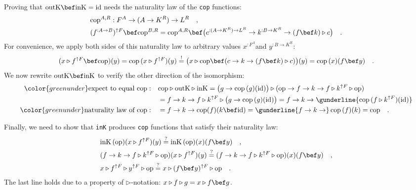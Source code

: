 Proving that $\text{outK}\bef\text{inK}=\text{id}$ needs the naturality
law of the \lstinline!cop! functions:
\begin{align*}
 & \text{cop}^{A,R}:F^{A}\rightarrow(A\rightarrow K^{R})\rightarrow L^{R}\quad,\\
 & (f^{:A\rightarrow B})^{\uparrow F}\bef\text{cop}^{B,R}=\text{cop}^{A,R}\bef\big(c^{:(A\rightarrow K^{R})\rightarrow L^{R}}\rightarrow k^{:B\rightarrow K^{R}}\rightarrow(f\bef k)\triangleright c\big)\quad.
\end{align*}
For convenience, we apply both sides of this naturality law to arbitrary
values $x^{:F^{A}}$and $y^{:B\rightarrow K^{R}}$:
\begin{equation}
(x\triangleright f^{\uparrow F}\bef\text{cop})(y)=\text{cop}\,(x\triangleright f^{\uparrow F})(y)\overset{!}{=}\big(x\triangleright\text{cop}\bef(c\rightarrow k\rightarrow(f\bef k)\triangleright c)\big)(y)=\text{cop}\,(x)(f\bef y)\quad.\label{eq:monatron-naturality-law-of-cop}
\end{equation}
We now rewrite $\text{outK}\bef\text{inK}$ to verify the other direction
of the isomorphism:
\begin{align*}
{\color{greenunder}\text{expect to equal }\text{cop}:}\quad & \text{cop}\triangleright\text{outK}\triangleright\text{inK}=\big(g\rightarrow\text{cop}\,(g)(\text{id})\big)\triangleright(\text{op}\rightarrow f\rightarrow k\rightarrow f\triangleright k^{\uparrow F}\triangleright\text{op})\\
 & =f\rightarrow k\rightarrow f\triangleright k^{\uparrow F}\triangleright\big(g\rightarrow\text{cop}\,(g)(\text{id})\big)=f\rightarrow k\rightarrow\gunderline{\text{cop}\,(f\triangleright k^{\uparrow F})(\text{id})}\\
{\color{greenunder}\text{naturality law of }\text{cop}:}\quad & =f\rightarrow k\rightarrow\text{cop}(f)(k\bef\text{id})=\gunderline{f\rightarrow k\rightarrow}\,\text{cop}\,(f)(k)=\text{cop}\quad.
\end{align*}

Finally, we need to show that \lstinline!inK! produces \lstinline!cop!
functions that satisfy their naturality law:
\begin{align*}
 & \text{inK}\,(\text{op})(x\triangleright f^{\uparrow F})(y)\overset{?}{=}\text{inK}\,(\text{op})(x)(f\bef y)\quad,\\
 & (f\rightarrow k\rightarrow f\triangleright k^{\uparrow F}\triangleright\text{op})(x\triangleright f^{\uparrow F})(y)\overset{?}{=}(f\rightarrow k\rightarrow f\triangleright k^{\uparrow F}\triangleright\text{op})(x)(f\bef y)\quad,\\
 & x\triangleright f^{\uparrow F}\triangleright y^{\uparrow F}\triangleright\text{op}\overset{?}{=}x\triangleright(f\bef y)^{\uparrow F}\triangleright\text{op}\quad.
\end{align*}
The last line holds due to a property of $\triangleright$-notation:
$x\triangleright f\triangleright g=x\triangleright f\bef g$.

